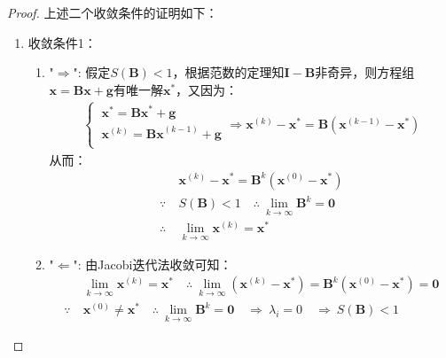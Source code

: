 \begin{proof}
    上述二个收敛条件的证明如下：
    \begin{enumerate}
        \item 收敛条件1：
            \begin{enumerate}
                \item "$\Rightarrow$":
                    假定$S(\boldsymbol{B})<1$，根据范数的定理知$\boldsymbol{I}-\boldsymbol{B}$非奇异，则方程组$\boldsymbol{x}=\boldsymbol{Bx}+\boldsymbol{g}$有唯一解$\boldsymbol{x}^\ast$，又因为：
                    \begin{align*}
                        \begin{cases}
                            \ \boldsymbol{x}^{\ast}=\boldsymbol{Bx}^\ast+\boldsymbol{g} \\
                            \ \boldsymbol{x}^{(k)} = \boldsymbol{Bx}^{(k-1)} + \boldsymbol{g} \\
                        \end{cases} \Rightarrow \boldsymbol{x}^{(k)} - \boldsymbol{x}^{\ast} = \boldsymbol{B}(\boldsymbol{x}^{(k-1)} - \boldsymbol{x}^{\ast})
                    \end{align*}
                    从而：
                    \begin{align*}
                        & \boldsymbol{x}^{(k)} - \boldsymbol{x}^{\ast} = \boldsymbol{B}^k (\boldsymbol{x}^{(0)} - \boldsymbol{x}^{\ast}) \\[3mm]
                        \because \  & S(\boldsymbol{B}) < 1 \quad \therefore \ \lim_{k\rightarrow\infty}\boldsymbol{B}^k = \boldsymbol{0} \\[3mm]
                        \therefore \ & \lim_{k\rightarrow\infty}\boldsymbol{x}^{(k)} = \boldsymbol{x}^\ast
                    \end{align*}
                \item "$\Leftarrow$":
                    由Jacobi迭代法收敛可知：
                    \begin{align*}
                        & \lim_{k\rightarrow\infty}\boldsymbol{x}^{(k)} = \boldsymbol{x}^\ast \quad \therefore \ \lim_{k\rightarrow\infty}(\boldsymbol{x}^{(k)}-\boldsymbol{x}^\ast) = \boldsymbol{B}^k (\boldsymbol{x}^{(0)} - \boldsymbol{x}^{\ast}) = \boldsymbol{0} \\[3mm]
                        \because \ & \boldsymbol{x}^{(0)} \neq \boldsymbol{x}^\ast \quad \therefore \ \lim_{k\rightarrow\infty}\boldsymbol{B}^k = \boldsymbol{0} \quad \Rightarrow \ \lambda_i = 0 \quad \Rightarrow \ S(\boldsymbol{B}) < 1

\end{align*}
\end{enumerate}
\end{enumerate}
\end{proof}
